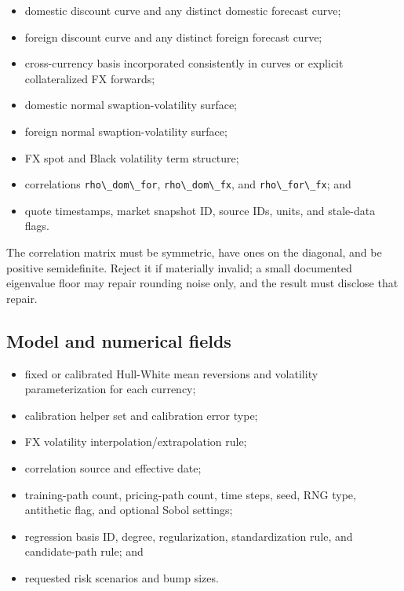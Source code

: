 \documentclass[conference]{IEEEtran}
\newcommand{\passthrough}[1]{#1}
\providecommand{\tightlist}{}
\begin{document}
\begin{itemize}
\tightlist
\item
  domestic discount curve and any distinct domestic forecast curve;
\item
  foreign discount curve and any distinct foreign forecast curve;
\item
  cross-currency basis incorporated consistently in curves or explicit
  collateralized FX forwards;
\item
  domestic normal swaption-volatility surface;
\item
  foreign normal swaption-volatility surface;
\item
  FX spot and Black volatility term structure;
\item
  correlations \passthrough{\lstinline!rho\_dom\_for!},
  \passthrough{\lstinline!rho\_dom\_fx!}, and
  \passthrough{\lstinline!rho\_for\_fx!}; and
\item
  quote timestamps, market snapshot ID, source IDs, units, and
  stale-data flags.
\end{itemize}

The correlation matrix must be symmetric, have ones on the diagonal, and
be positive semidefinite. Reject it if materially invalid; a small
documented eigenvalue floor may repair rounding noise only, and the
result must disclose that repair.

\subsection{Model and numerical
fields}\label{43-model-and-numerical-fields}

\begin{itemize}
\tightlist
\item
  fixed or calibrated Hull-White mean reversions and volatility
  parameterization for each currency;
\item
  calibration helper set and calibration error type;
\item
  FX volatility interpolation/extrapolation rule;
\item
  correlation source and effective date;
\item
  training-path count, pricing-path count, time steps, seed, RNG type,
  antithetic flag, and optional Sobol settings;
\item
  regression basis ID, degree, regularization, standardization rule, and
  candidate-path rule; and
\item
  requested risk scenarios and bump sizes.
\end{itemize}
\end{document}
